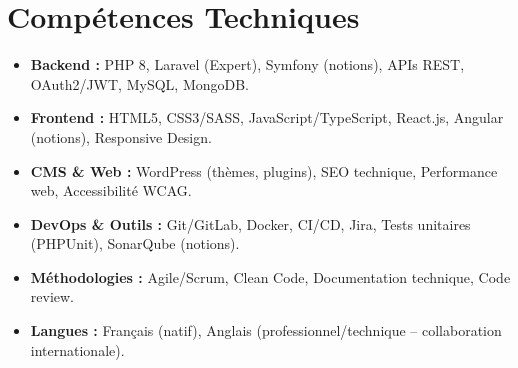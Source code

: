 \documentclass[a4paper,11pt]{article}
\begin{document}
\section{Compétences Techniques}
\begin{itemize}[leftmargin=*, nosep]
    \item \small{\textbf{Backend :} PHP 8, Laravel (Expert), Symfony (notions), APIs REST, OAuth2/JWT, MySQL, MongoDB.}
    \item \small{\textbf{Frontend :} HTML5, CSS3/SASS, JavaScript/TypeScript, React.js, Angular (notions), Responsive Design.}
    \item \small{\textbf{CMS \& Web :} WordPress (thèmes, plugins), SEO technique, Performance web, Accessibilité WCAG.}
    \item \small{\textbf{DevOps \& Outils :} Git/GitLab, Docker, CI/CD, Jira, Tests unitaires (PHPUnit), SonarQube (notions).}
    \item \small{\textbf{Méthodologies :} Agile/Scrum, Clean Code, Documentation technique, Code review.}
    \item \small{\textbf{Langues :} Français (natif), Anglais (professionnel/technique -- collaboration internationale).}
\end{itemize}

\end{document}
